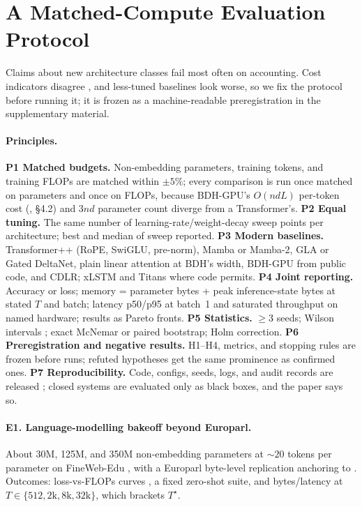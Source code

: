 \documentclass[10pt]{article}
\theoremstyle{remark}
\newcommand{\cdlr}{\textsc{CDLR}}
\begin{document}
\section{A Matched-Compute Evaluation Protocol}
\label{sec:protocol}

Claims about new architecture classes fail most often on accounting. Cost indicators disagree
\citep{dehghani2022efficiency}, and less-tuned baselines look worse, so we fix the protocol before running it; it is
frozen as a machine-readable preregistration in the supplementary material.

\paragraph{Principles.}
\textbf{P1 Matched budgets.} Non-embedding parameters, training tokens, and training FLOPs are matched within $\pm5\%$;
every comparison is run once matched on parameters and once on FLOPs, because BDH-GPU's $O(ndL)$ per-token cost
(\citealp{kosowski2025bdh}, \S4.2) and $3nd$ parameter count diverge from a Transformer's.
\textbf{P2 Equal tuning.} The same number of learning-rate/weight-decay sweep points per architecture; best and median of
sweep reported. \textbf{P3 Modern baselines.} Transformer++ (RoPE, SwiGLU, pre-norm), Mamba or Mamba-2, GLA or Gated
DeltaNet, plain linear attention at BDH's width, BDH-GPU from public code, and \cdlr; xLSTM and Titans where code
permits. \textbf{P4 Joint reporting.} Accuracy or loss; memory = parameter bytes + peak inference-state bytes at stated $T$
and batch; latency p50/p95 at batch~1 and saturated throughput on named hardware; results as Pareto fronts.
\textbf{P5 Statistics.} $\ge3$ seeds; Wilson intervals \citep{wilson1927probable}; exact McNemar \citep{mcnemar1947note} or
paired bootstrap; Holm correction. \textbf{P6 Preregistration and negative results.} H1--H4, metrics, and stopping rules
are frozen before runs; refuted hypotheses get the same prominence as confirmed ones. \textbf{P7 Reproducibility.}
Code, configs, seeds, logs, and audit records are released \citep{pineau2021reproducibility}; closed systems are
evaluated only as black boxes, and the paper says so.

\paragraph{E1. Language-modelling bakeoff beyond Europarl.} About 30M, 125M, and 350M non-embedding parameters at
${\sim}20$ tokens per parameter \citep{hoffmann2022chinchilla} on FineWeb-Edu \citep{penedo2024fineweb}, with a
Europarl byte-level replication \citep{koehn2005europarl} anchoring to \citet[App.~B.2]{kosowski2025bdh}. Outcomes:
loss-vs-FLOPs curves \citep{kaplan2020scaling}, a fixed zero-shot suite, and bytes/latency at
$T\in\{512,2\text{k},8\text{k},32\text{k}\}$, which brackets $T^\star$.
\end{document}
